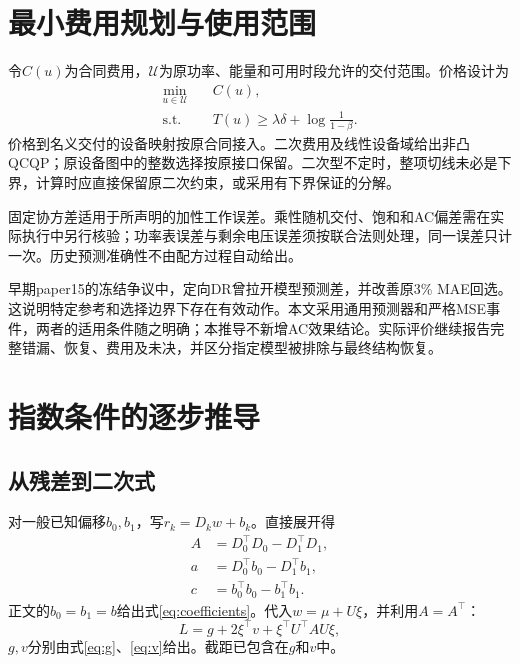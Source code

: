 \documentclass[journal,10pt]{IEEEtran}
\begin{document}
\section{最小费用规划与使用范围}
令$C(u)$为合同费用，$\mathcal U$为原功率、能量和可用时段允许的交付范围。价格设计为
\begin{equation}
\boxed{
\begin{aligned}
\min_{u\in\mathcal U}\quad&C(u),\\
\mathrm{s.t.}\quad&T(u)\ge\lambda\delta+\log\frac1{1-\beta}.
\end{aligned}} \label{eq:planning}
\end{equation}
价格到名义交付的设备映射按原合同接入。二次费用及线性设备域给出非凸QCQP；原设备图中的整数选择按原接口保留。二次型不定时，整项切线未必是下界，计算时应直接保留原二次约束，或采用有下界保证的分解。

固定协方差适用于所声明的加性工作误差。乘性随机交付、饱和和AC偏差需在实际执行中另行核验；功率表误差与剩余电压误差须按联合法则处理，同一误差只计一次。历史预测准确性不由配方过程自动给出。

早期paper15的冻结争议中，定向DR曾拉开模型预测差，并改善原3\% MAE回选。这说明特定参考和选择边界下存在有效动作。本文采用通用预测器和严格MSE事件，两者的适用条件随之明确；本推导不新增AC效果结论。实际评价继续报告完整错漏、恢复、费用及未决，并区分指定模型被排除与最终结构恢复。

\appendices
\section{指数条件的逐步推导}

\subsection{从残差到二次式}
对一般已知偏移$b_0,b_1$，写$r_k=D_kw+b_k$。直接展开得
\begin{align*}
A&=D_0^\top D_0-D_1^\top D_1,\\
a&=D_0^\top b_0-D_1^\top b_1,\\
c&=b_0^\top b_0-b_1^\top b_1.
\end{align*}
正文的$b_0=b_1=b$给出式\eqref{eq:coefficients}。代入$w=\mu+U\xi$，并利用$A=A^\top$：
\begin{equation}
L=g+2\xi^\top v+\xi^\top U^\top AU\xi, \label{eq:expanded}
\end{equation}
$g,v$分别由式\eqref{eq:g}、\eqref{eq:v}给出。截距已包含在$g$和$v$中。
\end{document}
